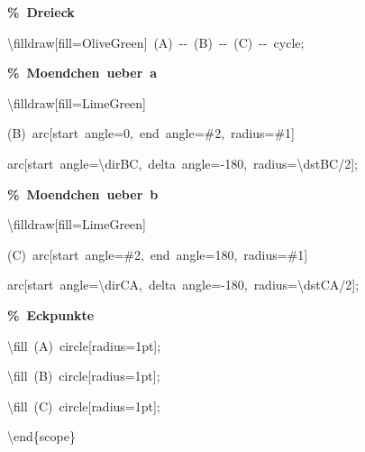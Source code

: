 {{\rule[-0.5ex]{0pt}{2.5ex}\hspace*{2.0em}\textcolor{G}{\textbf{\%~Dreieck}}\\
\rule[-0.5ex]{0pt}{2.5ex}\hspace*{2.0em}\textbackslash{}filldraw[fill=OliveGreen]~(A)~{-}{-}~(B)~{-}{-}~(C)~{-}{-}~cycle;\\
\rule[-0.5ex]{0pt}{2.5ex}\hspace*{2.0em}\textcolor{G}{\textbf{\%~Moendchen~ueber~a}}\\
\rule[-0.5ex]{0pt}{2.5ex}\hspace*{2.0em}\textbackslash{}filldraw[fill=LimeGreen]\\
\rule[-0.5ex]{0pt}{2.5ex}\hspace*{6.5em}(B)~arc[start~angle=0,~end~angle=\#2,~radius=\#1]\\
\rule[-0.5ex]{0pt}{2.5ex}\hspace*{8.5em}arc[start~angle=\textbackslash{}dirBC,~delta~angle={-}180,~radius=\textbackslash{}dstBC/2];\\
\rule[-0.5ex]{0pt}{2.5ex}\hspace*{2.0em}\textcolor{G}{\textbf{\%~Moendchen~ueber~b}}\\
\rule[-0.5ex]{0pt}{2.5ex}\hspace*{2.0em}\textbackslash{}filldraw[fill=LimeGreen]\\
\rule[-0.5ex]{0pt}{2.5ex}\hspace*{6.5em}(C)~arc[start~angle=\#2,~end~angle=180,~radius=\#1]\\
\rule[-0.5ex]{0pt}{2.5ex}\hspace*{8.5em}arc[start~angle=\textbackslash{}dirCA,~delta~angle={-}180,~radius=\textbackslash{}dstCA/2];\\
\rule[-0.5ex]{0pt}{2.5ex}\hspace*{2.0em}\textcolor{G}{\textbf{\%~Eckpunkte}}\\
\rule[-0.5ex]{0pt}{2.5ex}\hspace*{2.0em}\textbackslash{}fill~(A)~circle[radius=1pt];\\
\rule[-0.5ex]{0pt}{2.5ex}\hspace*{2.0em}\textbackslash{}fill~(B)~circle[radius=1pt];\\
\rule[-0.5ex]{0pt}{2.5ex}\hspace*{2.0em}\textbackslash{}fill~(C)~circle[radius=1pt];\\
\rule[-0.5ex]{0pt}{2.5ex}\hspace*{1.0em}\textbackslash{}end\{scope\}\\
}}
